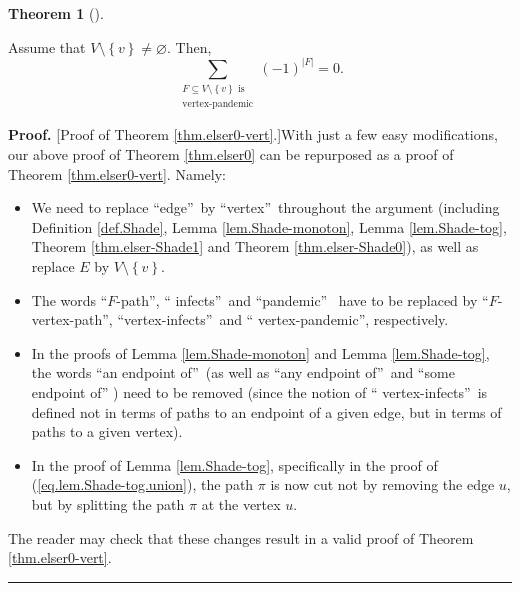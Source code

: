 \documentclass[numbers=enddot,12pt,final,onecolumn]{scrartcl}%
\theoremstyle{definition}
\newtheorem{theo}{Theorem}[section]
\newenvironment{theorem}[1][]
{\begin{theo}[#1]\begin{leftbar}}
{\end{leftbar}\end{theo}}
\newenvironment{proof}[1][Proof]{\noindent\textbf{#1.} }{\ \rule{0.5em}{0.5em}}
\let\sumnonlimits\sum
\renewcommand{\sum}{\sumnonlimits\limits}
\begin{document}
\begin{theorem}
\label{thm.elser0-vert}Assume that $V\setminus\left\{  v\right\}
\neq\varnothing$. Then,%
\[
\sum_{\substack{F\subseteq V\setminus\left\{  v\right\}  \text{ is}%
\\\text{vertex-pandemic}}}\left(  -1\right)  ^{\left\vert F\right\vert }=0.
\]

\end{theorem}

\begin{proof}
[Proof of Theorem \ref{thm.elser0-vert}.]With just a few easy modifications,
our above proof of Theorem \ref{thm.elser0} can be repurposed as a proof of
Theorem \ref{thm.elser0-vert}. Namely:

\begin{itemize}
\item We need to replace \textquotedblleft edge\textquotedblright\ by
\textquotedblleft vertex\textquotedblright\ throughout the argument (including
Definition \ref{def.Shade}, Lemma \ref{lem.Shade-monoton}, Lemma
\ref{lem.Shade-tog}, Theorem \ref{thm.elser-Shade1} and Theorem
\ref{thm.elser-Shade0}), as well as replace $E$ by $V\setminus\left\{
v\right\}  $.

\item The words \textquotedblleft$F$-path\textquotedblright, \textquotedblleft
infects\textquotedblright\ and \textquotedblleft pandemic\textquotedblright%
\ have to be replaced by \textquotedblleft$F$-vertex-path\textquotedblright,
\textquotedblleft vertex-infects\textquotedblright\ and \textquotedblleft
vertex-pandemic\textquotedblright, respectively.

\item In the proofs of Lemma \ref{lem.Shade-monoton} and Lemma
\ref{lem.Shade-tog}, the words \textquotedblleft an endpoint
of\textquotedblright\ (as well as \textquotedblleft any endpoint
of\textquotedblright\ and \textquotedblleft some endpoint of\textquotedblright%
) need to be removed (since the notion of \textquotedblleft
vertex-infects\textquotedblright\ is defined not in terms of paths to an
endpoint of a given edge, but in terms of paths to a given vertex).

\item In the proof of Lemma \ref{lem.Shade-tog}, specifically in the proof of
(\ref{eq.lem.Shade-tog.union}), the path $\pi$ is now cut not by removing the
edge $u$, but by splitting the path $\pi$ at the vertex $u$.
\end{itemize}

\noindent The reader may check that these changes result in a valid proof of
Theorem \ref{thm.elser0-vert}.
\end{proof}
\end{document}
